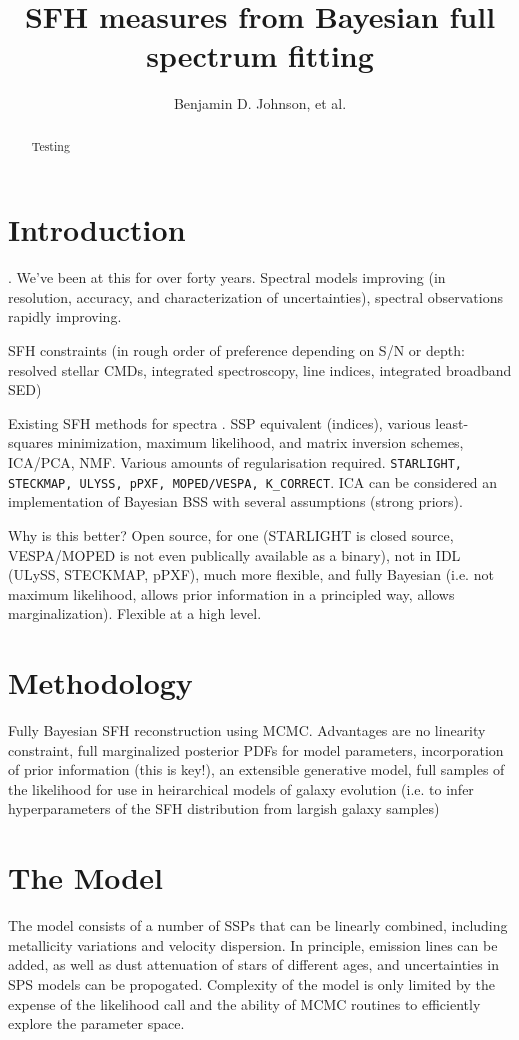 \documentclass{emulateapj}
\begin{document}
\title{SFH measures from Bayesian full spectrum fitting}
\author{
Benjamin D. Johnson,
et al.}

\begin{abstract}
Testing
\end{abstract}

\section{Introduction}
\citet{tinsley68}.  We've been at this for over forty years. Spectral models improving (in resolution, accuracy, and characterization of uncertainties), spectral observations rapidly improving.

SFH constraints (in rough order of preference depending on S/N or depth: resolved stellar CMDs, integrated spectroscopy, line indices, integrated broadband SED)

Existing SFH methods for spectra \citep{walcher2011}.  SSP equivalent (indices), various least-squares minimization, maximum likelihood, and matrix inversion schemes, ICA/PCA, NMF. Various amounts of regularisation required. \texttt{STARLIGHT, STECKMAP, ULYSS, pPXF, MOPED/VESPA, K\_CORRECT}. ICA can be considered an implementation of Bayesian BSS with several assumptions (strong priors).

Why is this better?   Open source, for one (STARLIGHT is closed source, VESPA/MOPED is not even publically available as a binary), not in IDL (ULySS, STECKMAP, pPXF), much more flexible, and fully Bayesian (i.e. not maximum likelihood, allows prior information in a principled way, allows marginalization).  Flexible at a high level.

\section{Methodology}
Fully Bayesian SFH reconstruction using MCMC.  Advantages are no linearity constraint, full marginalized posterior PDFs for model parameters, incorporation of prior information (this is key!), an extensible generative model, full samples of the likelihood for use in heirarchical models of galaxy evolution (i.e. to infer hyperparameters of the SFH distribution from largish galaxy samples)


\section{The Model}
The model consists of a number of SSPs that can be linearly combined, including metallicity variations and velocity dispersion.  In principle, emission lines can be added, as well as dust attenuation of stars of different ages, and uncertainties in SPS models can be propogated.  Complexity of the model is only limited by the expense of the likelihood call and the ability of MCMC routines to efficiently explore the parameter space.
\end{document}
